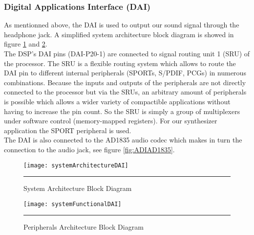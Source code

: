 \subsubsection{Digital Applications Interface (DAI)}
As mentionned above, the DAI is used to output our sound signal through the headphone jack. A simplified system architecture block diagram is showed in figure \ref{fig:DAI1} and \ref{fig:DAI2}.\\ The DSP's DAI pins (DAI-P20-1) are connected to signal routing unit 1 (SRU) of the processor. The SRU is a flexible routing system which allows to route the DAI pin to different internal peripherals (SPORTs, S/PDIF, PCGs) in numerous combinations. Because the inputs and outputs of the peripherals are not directly connected to the processor but via the SRUs, an arbitrary amount of peripherals is possible which allows a wider variety of compactible applications without having to increase the pin count. So the SRU is simply a group of multiplexers under software control (memory-mapped registers). For our synthesizer application the SPORT peripheral is used.\\The DAI is also connected to the AD1835 audio codec which makes in turn the connection to the audio jack, see figure \ref{fig:ADIAD1835}. 
\begin{figure}[htbp]
\centering
\texttt{[image: systemArchitectureDAI]}
\rule{30em}{0.5pt}
\caption{System Architecture Block Diagram}
\label{fig:DAI1}
\end{figure}
\begin{figure}[htbp]
\centering
\texttt{[image: systemFunctionalDAI]}
\rule{30em}{0.5pt}
\caption{Peripherals Architecture Block Diagram}
\label{fig:DAI2}
\end{figure}
